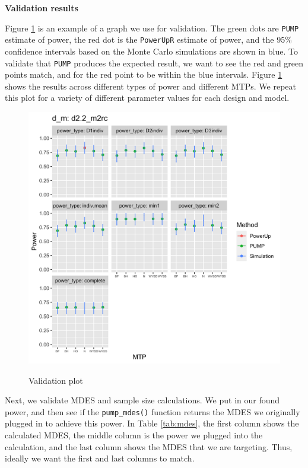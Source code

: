 \documentclass{article}
\begin{document}
\textbf{Validation results}

Figure \ref{fig:validate} is an example of a graph we use for
validation. The green dots are \texttt{PUMP} estimate of power, the red
dot is the \texttt{PowerUpR} estimate of power, and the 95\% confidence
intervals based on the Monte Carlo simulations are shown in blue. To
validate that \texttt{PUMP} produces the expected result, we want to see
the red and green points match, and for the red point to be within the
blue intervals. Figure \ref{fig:validate} shows the results across
different types of power and different MTPs. We repeat this plot for a
variety of different parameter values for each design and model.

\begin{figure}[h!]
\centering
  \includegraphics[width=6in]{example_validation_plot.png}
  \label{fig:validate}
  \caption{Validation plot}
\end{figure}

Next, we validate MDES and sample size calculations. We put in our found
power, and then see if the \texttt{pump\_mdes()} function returns the
MDES we originally plugged in to achieve this power. In Table
\ref{tab:mdes}, the first column shows the calculated MDES, the middle
column is the power we plugged into the calculation, and the last column
shows the MDES that we are targeting. Thus, ideally we want the first
and last columns to match.
\end{document}
